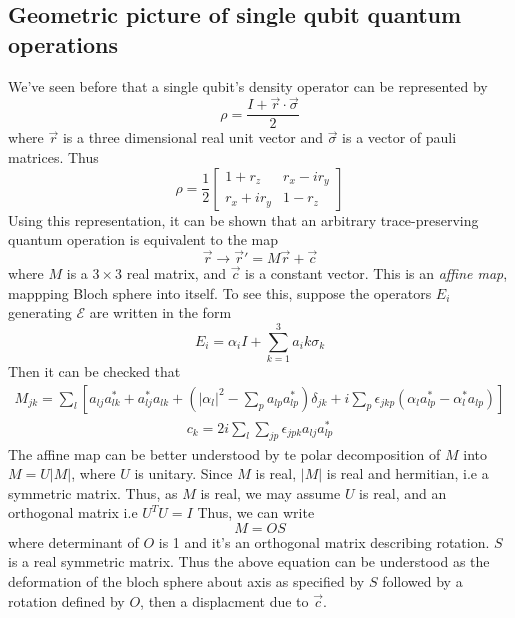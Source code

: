 \subsection{Geometric picture of single qubit quantum operations}
We've seen before that a single qubit's density operator can be represented by
\begin{equation}
    \rho = \frac{I+\Vec{r} \cdot \Vec{\sigma}}{2}
\end{equation}
where $\Vec{r}$ is a three dimensional real unit vector and $\Vec{\sigma}$ is a vector of pauli matrices. Thus
\begin{equation}
    \rho = \frac{1}{2}\begin{bmatrix}
        1+r_z & r_x-ir_y \\ r_x+ir_y & 1-r_z
    \end{bmatrix}
\end{equation}
Using this representation, it can be shown that an arbitrary trace-preserving quantum operation is equivalent to the map
\begin{equation}
    \Vec{r} \longrightarrow \Vec{r}' = M\Vec{r} + \Vec{c}
\end{equation}
where $M$ is a $3\times 3$ real matrix, and $\Vec{c}$ is a constant vector. This is an \textit{affine map}, mappping Bloch sphere into itself. To see this, suppose the operators $E_i$ generating $\mathcal{E}$ are written in the form
\begin{equation}
    E_i = \alpha_i I + \sum_{k=1}^3 a_ik\sigma_k
\end{equation}
Then it can be checked that
\begin{align}
    M_{jk} = \sum_l \left[ a_{lj}a_{lk}^* + a_{lj}^*a_{lk} + \left( |\alpha_l|^2 - \sum_p a_{lp}a_{lp}^* \right) \delta_{jk} + i\sum_p \epsilon_{jkp}(\alpha_la_{lp}^* - \alpha_l^*a_{lp}) \right] 
\end{align}
\begin{align}
    c_k = 2i \sum_l \sum_{jp}\epsilon_{jpk}a_{lj}a_{lp}^*
\end{align}
The affine map can be better understood by te polar decomposition of $M$ into $M=U|M|$, where $U$ is unitary. Since $M$ is real, $|M|$ is real and hermitian, i.e a symmetric matrix. Thus, as $M$ is real, we may assume $U$ is real, and an orthogonal matrix i.e $U^TU=I$ Thus, we can write
\begin{equation}
    M = OS
\end{equation}
where determinant of $O$ is 1 and it's an orthogonal matrix describing rotation. $S$ is a real symmetric matrix. Thus the above equation can be understood as the deformation of the bloch sphere about axis as specified by $S$ followed by a rotation defined by $O$, then a displacment due to $\Vec{c}$.

